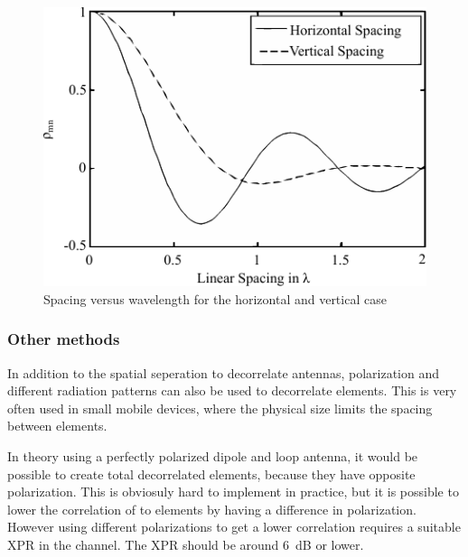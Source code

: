 \begin{figure}[htbp]
  \centering
  \includegraphics[scale=1.2]{img/analysis/mimoSpacing}
  \caption{Spacing versus wavelength for the horizontal and vertical case\cite{Tim2012Practical}}
  \label{fig:mimo-spacing}
\end{figure}

\subsubsection{Other methods} %
In addition to the spatial seperation to decorrelate antennas, polarization and different radiation patterns can also be used to decorrelate elements. This is very often used in small mobile devices, where the physical size limits the spacing between elements.  

In theory using a perfectly polarized dipole and loop antenna, it would be possible to create total decorrelated elements, because they have opposite polarization. This is obviosuly hard to implement in practice, but it is possible to lower the correlation of to elements by having a difference in polarization. However using different polarizations to get a lower correlation requires a suitable XPR in the channel. The XPR should be around \SI{6}{dB} or lower\cite{Tim2012Practical}. 






 




